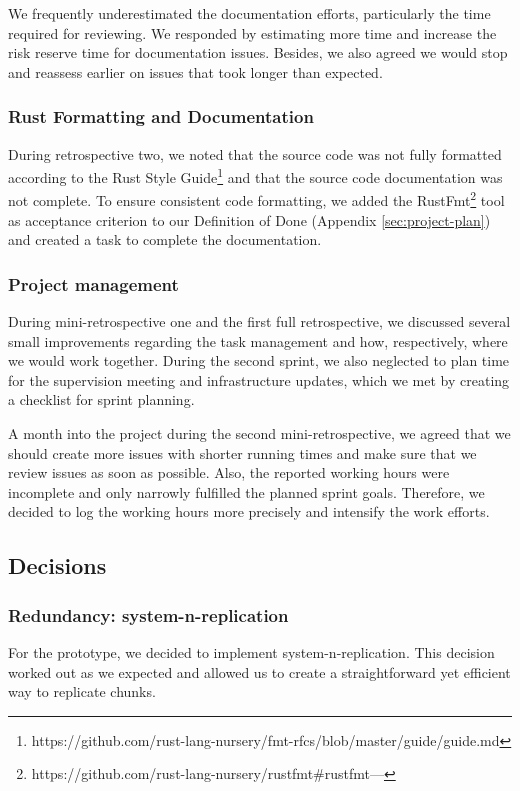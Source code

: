 We frequently underestimated the documentation efforts, particularly the time required for reviewing. We responded by estimating more time and increase the risk reserve time for documentation issues. Besides, we also agreed we would stop and reassess earlier on issues that took longer than expected.

\subsubsection{Rust Formatting and Documentation}
During retrospective two, we noted that the source code was not fully formatted according to the Rust Style Guide\footnote{https://github.com/rust-lang-nursery/fmt-rfcs/blob/master/guide/guide.md} and that the source code documentation was not complete. To ensure consistent code formatting, we added the RustFmt\footnote{https://github.com/rust-lang-nursery/rustfmt\#rustfmt---} tool as acceptance criterion to our Definition of Done (Appendix \ref{sec:project-plan}) and created a task to complete the documentation.

\subsubsection{Project management}
During mini-retrospective one and the first full retrospective, we discussed several small improvements regarding the task management and how, respectively, where we would work together. During the second sprint, we also neglected to plan time for the supervision meeting and infrastructure updates, which we met by creating a checklist for sprint planning.

A month into the project during the second mini-retrospective, we agreed that we should create more issues with shorter running times and make sure that we review issues as soon as possible. Also, the reported working hours were incomplete and only narrowly fulfilled the planned sprint goals. Therefore, we decided to log the working hours more precisely and intensify the work efforts.


\subsection{Decisions}
\subsubsection{Redundancy: \gls{system-n-replication}}
For the prototype, we decided to implement \gls{system-n-replication}. This decision worked out as we expected and allowed us to create a straightforward yet efficient way to replicate \glspl{chunk}.

